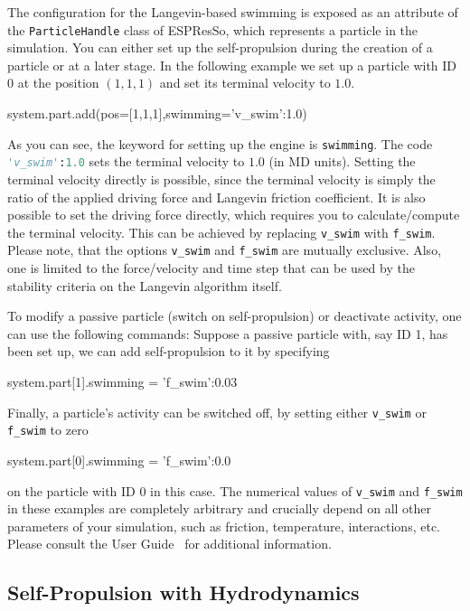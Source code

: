 \documentclass[aip,jcp,reprint,a4paper,onecolumn,amsmath]{revtex4-1}
\newcommand{\es}{\mbox{\textsf{ESPResSo}}\xspace}
\newcommand\codees{\lstinline[language=python]}
\begin{document}
The configuration for the Langevin-based swimming is exposed as an attribute of
the \codees{ParticleHandle} class of \es{}, which represents a particle in the
simulation. You can either set up the self-propulsion during the creation of a
particle or at a later stage. In the following example we set up a particle
with ID 0 at the position $(1,1,1)$ and set its terminal velocity to $1.0$.
\begin{espresso}
system.part.add(pos=[1,1,1],swimming={'v_swim':1.0})
\end{espresso}
As you can see, the keyword for setting up the engine is \codees{swimming}. The
code \codees{'v_swim':1.0} sets the terminal velocity to $1.0$ (in MD units).
Setting the terminal velocity directly is possible, since the terminal velocity
is simply the ratio of the applied driving force and Langevin friction
coefficient. It is also possible to set the driving force directly, which
requires you to calculate/compute the terminal velocity. This can be achieved
by replacing \codees{v_swim} with \codees{f_swim}. Please note, that the
options \codees{v_swim} and \codees{f_swim} are mutually exclusive. Also, one
is limited to the force/velocity and time step that can be used by the
stability criteria on the Langevin algorithm itself.

To modify a passive particle (switch on self-propulsion) or deactivate
activity, one can use the following commands: Suppose a passive particle with,
say ID 1, has been set up, we can add self-propulsion to it by specifying
\begin{espresso}
system.part[1].swimming = {'f_swim':0.03}
\end{espresso}
Finally, a particle's activity can be switched off, by setting either \codees{v_swim} or \codees{f_swim} to zero
\begin{espresso}
system.part[0].swimming = {'f_swim':0.0}
\end{espresso}
on the particle with ID 0 in this case. The numerical values of \codees{v_swim}
and \codees{f_swim} in these examples are completely arbitrary and crucially
depend on all other parameters of your simulation, such as friction,
temperature, interactions, etc. Please consult the User Guide~\cite{UG} for
additional information.

\subsection{\label{sub:lattice}Self-Propulsion with Hydrodynamics}
\end{document}
